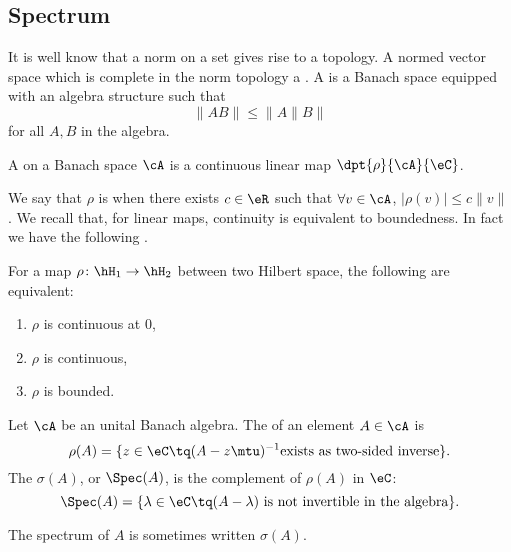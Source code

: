 \subsection{Spectrum}

It is well know that a norm on a set gives rise to a topology. A normed vector space which is complete in the norm topology a . A  is a Banach space equipped with an algebra structure such that
\begin{equation} \label{eq:normBanach}
  \|AB\|\leq\|A\|B\|
\end{equation}
for all $A,B$ in the algebra. \label{def_banach}

\begin{definition}			\label{def:fonctionelle}
A  on a Banach space $\cA$ is a continuous linear map $\dpt{\rho}{\cA}{\eC}$.
\end{definition}
We say that $\rho$ is  when there exists $c\in\eR$ such that $\forall v\in\cA$,  $|\rho(v)|\leq c\|v\|$.  We recall that, for linear maps, continuity is equivalent to boundedness. In fact we have the following \cite{Ops_Hilb_space}.
\begin{proposition}
	For a map $\rho\colon \hH_1\to \hH_2$ between two Hilbert space, the following are equivalent:
	\begin{enumerate}
	\item $\rho$ is continuous at $0$,
	\item $\rho$ is continuous,
	\item $\rho$ is bounded.
	\end{enumerate}
\end{proposition}

\begin{definition}
	Let $\cA$ be an unital Banach algebra. The  of an element $A\in \cA$ is
	\begin{equation}
	  \rho(A)=\{ z\in\eC\tq(A-z\mtu)^{-1}\text{exists as two-sided inverse}  \}.
	\end{equation}
	The  $\sigma(A)$, or $\Spec(A)$, is the complement of $\rho(A)$ in $\eC$:
	\begin{equation}
        \Spec(A)=\{ \lambda\in\eC\tq(A-\lambda) \text{ is not invertible in the algebra} \}.
	\end{equation}
\end{definition}
The spectrum of $A$ is sometimes written $\sigma(A)$.



